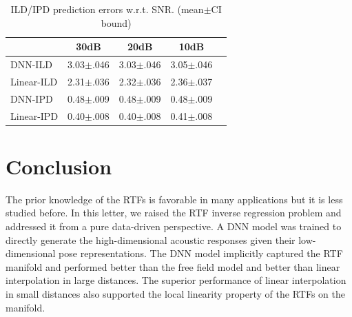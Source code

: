 \documentclass[journal]{IEEEtran}
\begin{document}
\begin{table}
\caption{ILD/IPD prediction errors w.r.t. SNR. (mean$\pm$CI bound)}
\label{table:noise}
\begin{center}
\begin{tabular}{|l|c|c|c|c|}
  \hline
                 & 30dB         & 20dB         & 10dB       \\ \hline \hline
   DNN-ILD     &3.03$\pm$.046  &3.03$\pm$.046 &3.05$\pm$.046  \\ \hline
   Linear-ILD  &2.31$\pm$.036  &2.32$\pm$.036 &2.36$\pm$.037   \\ \hline
   DNN-IPD     & 0.48$\pm$.009 & 0.48$\pm$.009 & 0.48$\pm$.009 \\ \hline
   Linear-IPD  & 0.40$\pm$.008 & 0.40$\pm$.008 &0.41$\pm$.008  \\ \hline
\end{tabular}
\end{center}
\end{table}


\section{Conclusion}

The prior knowledge of the RTFs is favorable in many applications but it is less studied before. In this letter, we raised the RTF inverse regression problem and addressed it from a pure data-driven perspective. A DNN model was trained to directly generate the high-dimensional acoustic responses given their low-dimensional pose representations. The DNN model implicitly captured the RTF manifold and performed better than the free field model and better than linear interpolation in large distances. The superior performance of linear interpolation in small distances also supported the local linearity property of the RTFs on the manifold.




\end{document}
